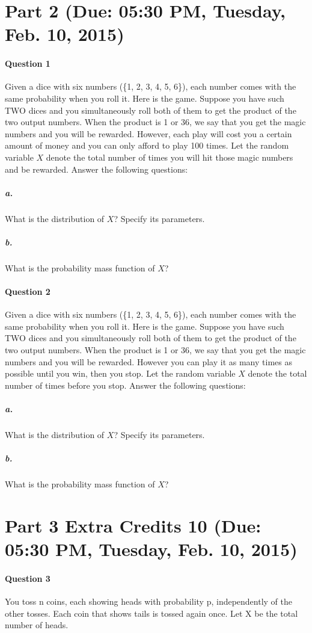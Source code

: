 \documentclass[11pt]{article} %
\begin{document}
\section{Part 2 (Due: 05:30 PM, Tuesday, Feb. 10, 2015)}
\paragraph*{\bf Question 1}
Given a dice with six numbers (\{1, 2, 3, 4, 5, 6\}), each number comes with the same probability when you roll it. Here is the game. Suppose you have such TWO dices and you simultaneously roll both of them to get the product of the two output numbers. When the product is 1 or 36, we say that you get the magic numbers and you will be rewarded. However, each play will cost you a certain amount of money and you can only afford to play 100 times. Let the random variable $X$ denote the total number of times you will hit those magic numbers and be rewarded. Answer the following questions:
\subparagraph*{a.} What is the distribution of $X$? Specify its parameters. 
\subparagraph*{b.} What is the probability mass function of $X$? 

\paragraph*{\bf Question 2}
Given a dice with six numbers (\{1, 2, 3, 4, 5, 6\}), each number comes with the same probability when you roll it. Here is the game. Suppose you have such TWO dices and you simultaneously roll both of them to get the product of the two output numbers. When the product is 1 or 36, we say that you get the magic numbers and you will be rewarded. However you can play it as many times as possible until you win, then you stop. Let the random variable $X$ denote the total number of times before you stop. Answer the following questions:
\subparagraph*{a.} What is the distribution of $X$? Specify its parameters. 
\subparagraph*{b.} What is the probability mass function of $X$? 

\vspace{8em}
\section{Part 3 Extra Credits 10 (Due: 05:30 PM, Tuesday, Feb. 10, 2015)}
\paragraph*{\bf Question 3}
You toss n coins, each showing heads with probability p, independently of the other tosses. Each coin that shows tails is tossed again once. Let X be the total number of heads. 
\end{document}
